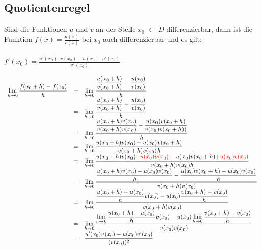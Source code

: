 \subsection{Quotientenregel}
\begin{Definition}
Sind die Funktionen $u$ und $v$ an der Stelle $x_{0}$ $\in$ $D$ differenzierbar, dann ist die Funktion $f(x)=\frac{u(x)} {v(x)}$ bei $x_{0}$ auch differenzierbar und es gilt: \\
\\
$f'(x_{0})=\frac{u'(x_{0})\cdot v(x_{0})-u(x_{0})\cdot v'(x_{0})}{v^2(x_{0})}$\\
\end{Definition}
\begin{Beweis}
$
\begin{array}{rcl}
\lim\limits_{h \rightarrow 0} {\dfrac{f(x_{0}+h)-f(x_{0})}{h}}&=& \lim\limits_{h \rightarrow 0} { \dfrac{ \dfrac{u(x_{0}+h)} {v(x_{0}+h)}- \dfrac{u(x_{0})}  {v(x_{0})}}  {h}}\\
&=&\lim\limits_{h \rightarrow 0} {\dfrac{\dfrac {u(x_{0}+h)}{v(x_{0}+h)}-\dfrac {u(x_{0})} {v(x_{0})}}   {h}}\\
&=&\lim\limits_{h \rightarrow 0} {\dfrac {\dfrac{  u(x_{0}+h)v(x_{0})}{v(x_{0}+h)v(x_{0})}   -\dfrac{u(x_{0})v(x_{0}+h)}{v(x_{0})v(x_{0}+h))}} {h}}\\
&=&\lim\limits_{h \rightarrow 0} {\dfrac     {u(x_{0}+h)v(x_{0})-u(x_{0})v(x_{0}+h)}    {v(x_{0}+h)v(x_{0})h }}\\
&=&\lim\limits_{h \rightarrow 0} {\dfrac {u(x_{0}+h)v(x_{0}) \textcolor{red}{-u(x_{0})v(x_{0})} -u(x_{0})v(x_{0}+h) \textcolor{red}{+u(x_{0})v(x_{0})}}  {v(x_{0}+h)v(x_{0})h}   }\\
&=&\lim\limits_{h \rightarrow 0} {\dfrac   {\dfrac{u(x_{0}+h)v(x_{0})-u(x_{0})v(x_{0})}{h}  -   \dfrac{u(x_{0})v(x_{0}+h)-u(x_{0})v(x_{0})} {h} }    {v(x_{0}+h)v(x_{0})}}\\
&=&\lim\limits_{h \rightarrow 0} { \dfrac     {\dfrac{u(x_{0}+h)-u(x_{0})}{h} v(x_{0})  -   u(x_{0}) \dfrac   {v(x_{0}+h)-v(x_{0})}  {h}  }         {v(x_{0}+h)v(x_{0})}     }\\
&=&\lim\limits_{h \rightarrow 0} { \dfrac  {\lim\limits_{h \rightarrow 0} {\dfrac{u(x_{0}+h)-u(x_{0})}{h}   }v(x_{0})  - u(x_{0}) \lim\limits_{h \rightarrow 0} { \dfrac{ v(x_{0}+h)-v(x_{0})}{h}   }  }      {v(x_{0})v(x_{0})}}    \\
&=& { \dfrac{u'(x_{0})v(x_{0})-u(x_{0})v'(x_{0})} {(v(x_{0}))^2}    }\\
\end{array}
$
\end{Beweis}

